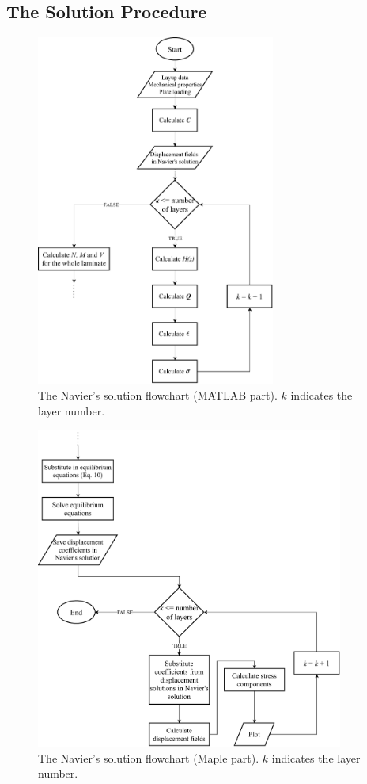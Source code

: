 \documentclass{article}
\begin{document}
\subsection{The Solution Procedure}

\begin{figure}[!]
    \centering
    \includegraphics[width = 0.7\textwidth ]{figures/flowchart_matlab.pdf}
    \caption{The Navier's solution flowchart (MATLAB part). $k$ indicates the layer number.}
    \label{fig:flowchart_matlab}
\end{figure}

\begin{figure}[!]
    \centering
    \includegraphics[width = 0.9\textwidth ]{figures/flowchart_maple.pdf}
    \caption{The Navier's solution flowchart (Maple part). $k$ indicates the layer number.}
    \label{fig:flowchart_maple}
\end{figure}
\end{document}

